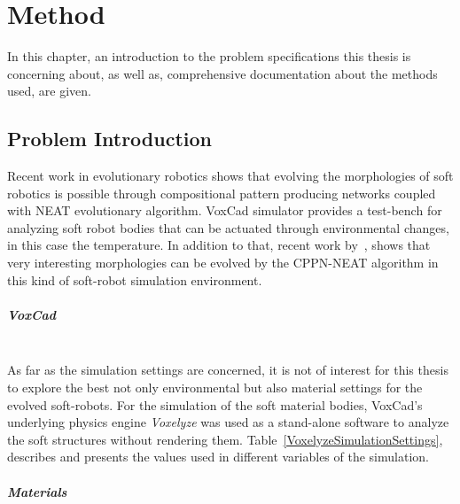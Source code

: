 
\chapter{Method} %

\label{Method} %


In this chapter, an introduction to the problem specifications this thesis is concerning about, as well as, comprehensive documentation about the methods used, are given.


\section{Problem Introduction}

Recent work in evolutionary robotics shows that evolving the morphologies of soft robotics is possible through compositional pattern producing networks coupled with NEAT evolutionary algorithm. VoxCad simulator provides a test-bench for analyzing soft robot bodies that can be actuated through environmental changes, in this case the temperature. In addition to that, recent work by~\cite{cheney2013unshackling}, shows that very interesting morphologies can be evolved by the CPPN-NEAT algorithm in this kind of soft-robot simulation environment.

\paragraph*{VoxCad}~\\
As far as the simulation settings are concerned, it is not of interest for this thesis to explore the best  not only environmental but also material settings for the evolved soft-robots. For the simulation of the soft material bodies, VoxCad's underlying physics engine \emph{Voxelyze} was used as a stand-alone software to analyze the soft structures without rendering them. Table~\ref{VoxelyzeSimulationSettings}, describes and presents the values used in different variables of the simulation.



\paragraph*{Materials}~\\

